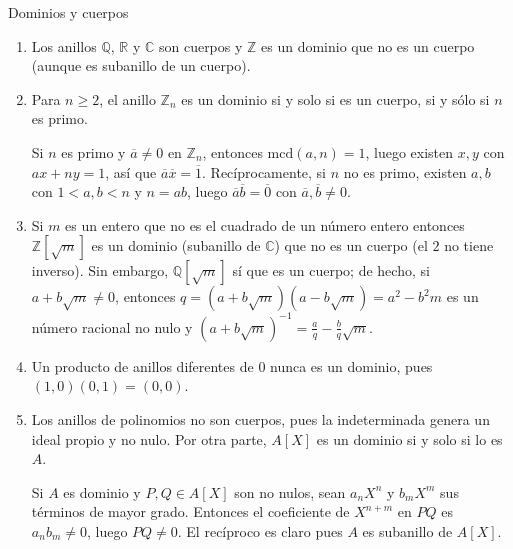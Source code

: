 \begin{example}{Dominios y cuerpos}{}

\begin{enumerate}
\item Los anillos \(\mathbb{Q}\), \(\mathbb{R}\) y \(\mathbb{C}\) son cuerpos y \(\mathbb{Z}\) es un dominio que no es un cuerpo (aunque es subanillo de un cuerpo).

\item Para \(n \geq 2\), el anillo \(\mathbb{Z}_n\) es un dominio si y solo si es un cuerpo, si y sólo si \(n\) es primo.

\begin{proofbox}
Si $n$ es primo y $\overline{a} \neq 0$ en $\mathbb{Z}_n$, entonces $\mathrm{mcd}(a,n) = 1$, luego existen $x,y$ con $ax + ny = 1$, así que $\overline{a}\overline{x} = \overline{1}$. Recíprocamente, si $n$ no es primo, existen $a,b$ con $1 < a,b < n$ y $n = ab$, luego $\overline{a}\overline{b} = \overline{0}$ con $\overline{a},\overline{b} \neq 0$.
\end{proofbox}

\item Si \(m\) es un entero que no es el cuadrado de un número entero entonces \(\mathbb{Z}[\sqrt{m}]\) es un dominio (subanillo de \(\mathbb{C}\)) que no es un cuerpo (el \(2\) no tiene inverso). Sin embargo, \(\mathbb{Q}[\sqrt{m}]\) sí que es un cuerpo; de hecho, si \(a + b\sqrt{m} \neq 0\), entonces \(q = (a + b\sqrt{m})(a - b\sqrt{m}) = a^2 - b^2 m\) es un número racional no nulo y \((a + b\sqrt{m})^{-1} = \frac{a}{q} - \frac{b}{q}\sqrt{m}\).

\item Un producto de anillos diferentes de \(0\) nunca es un dominio, pues \((1,0)(0,1) = (0,0)\).

\item Los anillos de polinomios no son cuerpos, pues la indeterminada genera un ideal propio y no nulo. Por otra parte, \(A[X]\) es un dominio si y solo si lo es \(A\).

\begin{proofbox}
Si $A$ es dominio y $P,Q \in A[X]$ son no nulos, sean $a_n X^n$ y $b_m X^m$ sus términos de mayor grado. Entonces el coeficiente de $X^{n+m}$ en $PQ$ es $a_n b_m \neq 0$, luego $PQ \neq 0$. El recíproco es claro pues $A$ es subanillo de $A[X]$.
\end{proofbox}

\end{enumerate}
\end{example}

